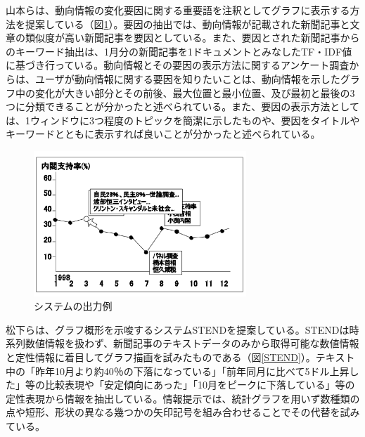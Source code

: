 \documentclass{matsushita-zemi}
\begin{document}
山本らは、動向情報の変化要因に関する重要語を注釈としてグラフに表示する方法を提案している（図\ref{system}）\cite{タグ付きコーパス}。要因の抽出では、動向情報が記載された新聞記事と文章の類似度が高い新聞記事を要因としている。また、要因とされた新聞記事からのキーワード抽出は、1月分の新聞記事を1ドキュメントとみなしたTF・IDF値に基づき行っている。動向情報とその要因の表示方法に関するアンケート調査からは、ユーザが動向情報に関する要因を知りたいことは、動向情報を示したグラフ中の変化が大きい部分とその前後、最大位置と最小位置、及び最初と最後の3つに分類できることが分かったと述べられている。また、要因の表示方法としては、1ウィンドウに3つ程度のトピックを簡潔に示したものや、要因をタイトルやキーワードとともに表示すれば良いことが分かったと述べられている。
\begin{figure}[tb]
  \begin{center}
   \includegraphics[width=8cm,bb=0 0 521 356]{tagu.PNG}
  \end{center}
 \caption{システムの出力例}
 \label{system}
\end{figure}

松下らは、グラフ概形を示唆するシステムSTENDを提案している\cite{STEND}。STENDは時系列数値情報を扱わず、新聞記事のテキストデータのみから取得可能な数値情報と定性情報に着目してグラフ描画を試みたものである（図\ref{STEND}）。テキスト中の「昨年10月より約40％の下落になっている」「前年同月に比べて5ドル上昇した」等の比較表現や「安定傾向にあった」「10月をピークに下落している」等の定性表現から情報を抽出している。情報提示では、統計グラフを用いず数種類の点や短形、形状の異なる幾つかの矢印記号を組み合わせることでその代替を試みている。
\end{document}
